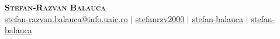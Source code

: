 \documentclass[letterpaper,11pt]{article}
\begin{document}

\begin{center}
    \textbf{\Huge \scshape Stefan-Razvan Balauca} \\ \vspace{1pt}
    \small
     \href{mailto:stefan-razvan.balauca@info.uaic.ro}{\underline{stefan-razvan.balauca@info.uaic.ro}} $|$
     \href{https://github.com/stefanrzv2000}{\underline{stefanrzv2000}} $|$
     \href{https://www.linkedin.com/in/stefan-balauca-43a69a252/}{\underline{stefan-balauca}} $|$
     \href{https://scholar.google.com/citations?user=C-kUYncAAAAJ&hl=en&oi=ao}{\underline{stefan-balauca}} 
\end{center}


\end{document}

